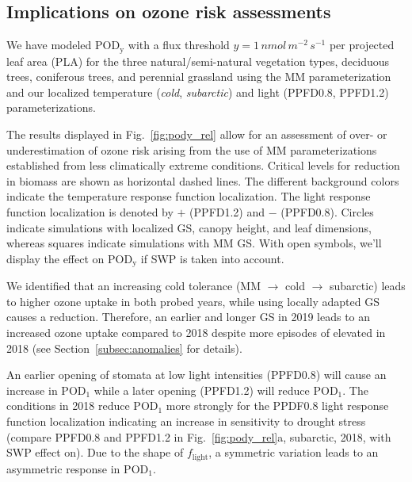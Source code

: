 \documentclass[bg, manuscript]{copernicus}
\begin{document}
\subsection{Implications on ozone risk assessments}
\label{subsec:do3se_results}

We have modeled $\mathrm{POD_y}$ with a flux threshold $y=1\,\unit{nmol\,m^{-2}\,s^{-1}}$ per projected leaf area (PLA) for the three natural/semi-natural vegetation types, deciduous trees, coniferous trees, and perennial grassland using the MM parameterization and our localized temperature (\emph{cold}, \emph{subarctic}) and light (PPFD0.8, PPFD1.2) parameterizations. 

The results displayed in Fig.~\ref{fig:pody_rel} allow for an assessment of over- or underestimation of ozone risk arising from the use of MM parameterizations established from less climatically extreme conditions. Critical levels for reduction in biomass \citep[deciduous forest $4\,\unit{\%}$, coniferous forest $2\,\unit{\%}$, and grasslands $10\,\unit{\%}$ biomass reduction adopted from][]{ICP:MappingManual2017,ESPR:Hayes2021} are shown as horizontal dashed lines. The different background colors indicate the temperature response function localization. The light response function localization is denoted by $+$ (PPFD1.2) and $-$ (PPFD0.8). Circles indicate simulations with localized GS, canopy height, and leaf dimensions, whereas squares indicate simulations with MM GS. With open symbols, we'll display the effect on $\mathrm{POD_y}$ if SWP is taken into account.

We identified that an increasing cold tolerance (MM $\rightarrow$ cold $\rightarrow$ subarctic) leads to higher ozone uptake in both probed years, while using locally adapted GS causes a reduction. Therefore, an earlier and longer GS in 2019 leads to an increased ozone uptake compared to 2018 despite more episodes of elevated \chem{[O_3]} in 2018 (see Section~\ref{subsec:anomalies} for details). 

An earlier opening of stomata at low light intensities (PPFD0.8) will cause an increase in $\mathrm{POD_1}$ while a later opening (PPFD1.2) will reduce $\mathrm{POD_1}$. The conditions in 2018 reduce $\mathrm{POD_1}$ more strongly for the PPDF0.8 light response function localization indicating an increase in sensitivity to drought stress (compare PPFD0.8 and PPFD1.2 in Fig.~\ref{fig:pody_rel}a, subarctic, 2018, with SWP effect on). Due to the shape of $f_\mathrm{light}$, a symmetric variation leads to an asymmetric response in $\mathrm{POD_1}$.
\end{document}
